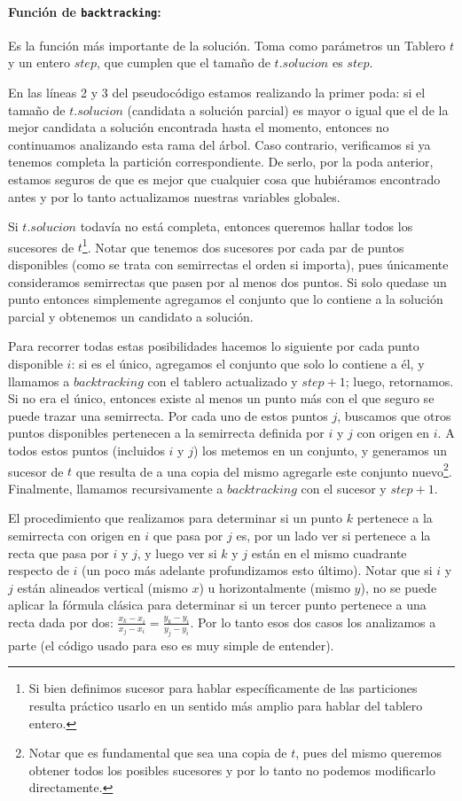   \paragraph{Función de \texttt{backtracking}:} Es la función más importante de la solución. Toma como parámetros un Tablero $t$ y un entero $step$, que cumplen que el tamaño de $t.solucion$ es $step$.

  En las líneas 2 y 3 del pseudocódigo estamos realizando la primer poda: si el tamaño de $t.solucion$ (candidata a solución parcial) es mayor o igual que el de la mejor candidata a solución encontrada hasta el momento, entonces no continuamos analizando esta rama del árbol. Caso contrario, verificamos si ya tenemos completa la partición correspondiente. De serlo, por la poda anterior, estamos seguros de que es mejor que cualquier cosa que hubiéramos encontrado antes y por lo tanto actualizamos nuestras variables globales. 

  Si $t.solucion$ todavía no está completa, entonces queremos hallar todos los sucesores de $t$\footnote{Si bien definimos sucesor para hablar específicamente de las particiones resulta práctico usarlo en un sentido más amplio para hablar del tablero entero.}. Notar que tenemos dos sucesores por cada par de puntos disponibles (como se trata con semirrectas el orden si importa), pues únicamente consideramos semirrectas que pasen por al menos  dos puntos. Si solo quedase un punto entonces simplemente agregamos el conjunto que lo contiene a la solución parcial y obtenemos un candidato a solución. 

  Para recorrer todas estas posibilidades hacemos lo siguiente por cada punto disponible $i$: si es el único, agregamos el conjunto que solo lo contiene a él, y llamamos a $backtracking$ con el tablero actualizado y $step+1$; luego, retornamos. Si no era el único, entonces existe al menos un punto más con el que seguro se puede trazar una semirrecta. Por cada uno de estos puntos $j$, buscamos que otros puntos disponibles pertenecen a la semirrecta definida por $i$ y $j$ con origen en $i$. A todos estos puntos (incluidos $i$ y $j$) los metemos en un conjunto, y generamos un sucesor de $t$ que resulta de a una copia del mismo agregarle este conjunto nuevo\footnote{Notar que es fundamental que sea una copia de $t$, pues del mismo queremos obtener todos los posibles sucesores y por lo tanto no podemos modificarlo directamente.}. Finalmente, llamamos recursivamente a $backtracking$ con el sucesor y $step+1$.

  El procedimiento que realizamos para determinar si un punto $k$ pertenece a la semirrecta con origen en $i$ que pasa por $j$ es, por un lado ver si pertenece a la recta que pasa por $i$ y $j$, y luego ver si $k$ y $j$ están en el mismo cuadrante respecto de $i$ (un poco más adelante profundizamos esto último). Notar que si $i$ y $j$ están alineados vertical (mismo $x$) u horizontalmente (mismo $y$), no se puede aplicar la fórmula clásica para determinar si un tercer punto pertenece a una recta dada por dos: $\frac{x_k-x_i}{x_j-x_i} = \frac{y_k-y_i}{y_j-y_i}$. Por lo tanto esos dos casos los analizamos a parte (el código usado para eso es muy simple de entender).

